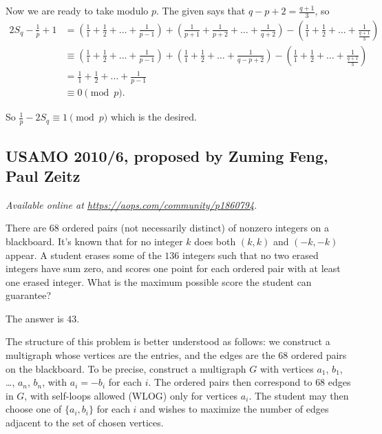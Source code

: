 \documentclass[11pt]{scrartcl}
\begin{document}
Now we are ready to take modulo $p$.
The given says that $q-p+2 = \frac{q+1}{3}$, so
\begin{align*}
  2S_q - \frac1p + 1
  &=  \left( \frac11 + \frac12 + \dots + \frac{1}{p-1} \right)
  + \left( \frac{1}{p+1} + \frac{1}{p+2} + \dots + \frac{1}{q+2} \right)
  - \left( \frac11 + \frac 12 + \dots + \frac{1}{\frac{q+1}{3}} \right) \\
  &\equiv  \left( \frac11 + \frac12 + \dots + \frac{1}{p-1} \right)
  + \left( \frac11 + \frac12 + \dots + \frac{1}{q-p+2} \right)
  - \left( \frac11 + \frac 12 + \dots + \frac{1}{\frac{q+1}{3}} \right) \\
  &= \frac11 + \frac12+ \dots + \frac{1}{p-1} \\
  &\equiv 0 \pmod p.
\end{align*}

So $\frac1p - 2S_q \equiv 1 \pmod p$ which is the desired.
\pagebreak

\subsection{USAMO 2010/6, proposed by Zuming Feng, Paul Zeitz}
\textsl{Available online at \url{https://aops.com/community/p1860794}.}
\begin{mdframed}[style=mdpurplebox,frametitle={Problem statement}]
There are $68$ ordered pairs (not necessarily distinct)
of nonzero integers on a blackboard.
It's known that for no integer $k$ does both $(k,k)$ and $(-k,-k)$ appear.
A student erases some of the $136$ integers such that
no two erased integers have sum zero, and scores one point
for each ordered pair with at least one erased integer.
What is the maximum possible score the student can guarantee?
\end{mdframed}
The answer is $43$.

The structure of this problem is better understood as follows:
we construct a multigraph whose vertices are the entries,
and the edges are the $68$ ordered pairs on the blackboard.
To be precise, construct a multigraph $G$ with vertices
$a_1$, $b_1$, \dots, $a_n$, $b_n$,
with $a_i = -b_i$ for each $i$.
The ordered pairs then correspond to $68$ edges in $G$,
with self-loops allowed (WLOG) only for vertices $a_i$.
The student may then choose one of $\{a_i, b_i\}$ for each $i$
and wishes to maximize the number of edges adjacent
to the set of chosen vertices.
\end{document}
